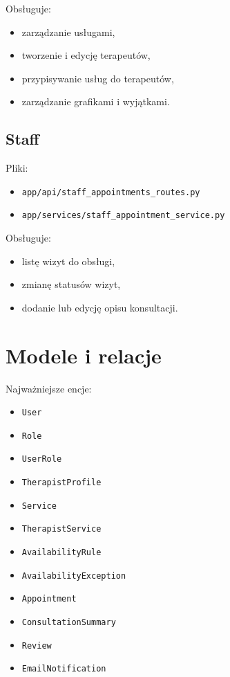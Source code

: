 \documentclass[11pt,a4paper]{article}
\begin{document}
Obsługuje:
\begin{itemize}[leftmargin=1.2cm]
    \item zarządzanie usługami,
    \item tworzenie i edycję terapeutów,
    \item przypisywanie usług do terapeutów,
    \item zarządzanie grafikami i wyjątkami.
\end{itemize}

\subsection{Staff}
Pliki:
\begin{itemize}[leftmargin=1.2cm]
    \item \texttt{app/api/staff\_appointments\_routes.py}
    \item \texttt{app/services/staff\_appointment\_service.py}
\end{itemize}

Obsługuje:
\begin{itemize}[leftmargin=1.2cm]
    \item listę wizyt do obsługi,
    \item zmianę statusów wizyt,
    \item dodanie lub edycję opisu konsultacji.
\end{itemize}

\section{Modele i relacje}

Najważniejsze encje:
\begin{itemize}[leftmargin=1.2cm]
    \item \texttt{User}
    \item \texttt{Role}
    \item \texttt{UserRole}
    \item \texttt{TherapistProfile}
    \item \texttt{Service}
    \item \texttt{TherapistService}
    \item \texttt{AvailabilityRule}
    \item \texttt{AvailabilityException}
    \item \texttt{Appointment}
    \item \texttt{ConsultationSummary}
    \item \texttt{Review}
    \item \texttt{EmailNotification}
\end{itemize}
\end{document}
